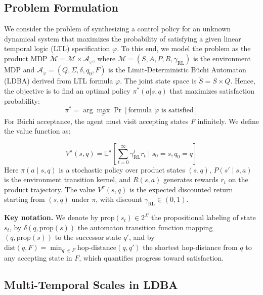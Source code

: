\documentclass[journal]{IEEEtran}
\begin{document}
\subsection{Problem Formulation}

We consider the problem of synthesizing a control policy for an unknown dynamical system that maximizes the probability of satisfying a given linear temporal logic (LTL) specification $\varphi$. To this end, we model the problem as the product MDP $\tilde{\mathcal{M}} = \mathcal{M} \times \mathcal{A}_\varphi$, where $\mathcal{M} = (S, A, P, R, \gamma_{\text{RL}})$ is the environment MDP and $\mathcal{A}_\varphi = (Q, \Sigma, \delta, q_0, F)$ is the Limit-Deterministic Büchi Automaton (LDBA) derived from LTL formula $\varphi$. The joint state space is $\tilde{S} = S \times Q$. Hence, the objective is to find an optimal policy $\pi^*(a|s,q)$ that maximizes satisfaction probability:
\begin{equation}
\pi^* = \arg\max_\pi \Pr[\text{formula } \varphi \text{ is satisfied}]
\label{eq:opt_policy}
\end{equation}
For Büchi acceptance, the agent must visit accepting states $F$ infinitely. We define the value function as:

\begin{equation}
V^\pi(s,q) = \mathbb{E}^\pi\left[\sum_{t=0}^\infty \gamma_{\text{RL}}^t r_t \mid s_0 = s, q_0 = q\right]
\label{eq:value_func}
\end{equation}
Here $\pi(a\mid s,q)$ is a stochastic policy over product states $(s,q)$, $P(s'\mid s,a)$ is the environment transition kernel, and $R(s,a)$ generates rewards $r_t$ on the product trajectory. The value $V^\pi(s,q)$ is the expected discounted return starting from $(s,q)$ under $\pi$, with discount $\gamma_{\text{RL}} \in (0,1)$.

\textbf{Key notation.} We denote by $\text{prop}(s_t) \in 2^\Sigma$ the propositional labeling of state $s_t$, by $\delta(q, \text{prop}(s))$ the automaton transition function mapping $(q, \text{prop}(s))$ to the successor state $q'$, and by $\text{dist}(q, F) = \min_{q' \in F} \text{hop-distance}(q, q')$ the shortest hop-distance from $q$ to any accepting state in $F$, which quantifies progress toward satisfaction.

\subsection{Multi-Temporal Scales in LDBA}
\end{document}
